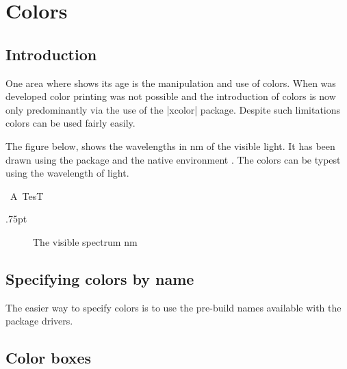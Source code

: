 \chapter{Colors}
\section{Introduction}

One area where \latex shows its age is the manipulation and use of colors. When \tex was developed color printing was not possible and the introduction of colors is now only predominantly via the use of the |xcolor| package. Despite such limitations colors can be used fairly easily.

The figure below, shows the wavelengths in nm of the visible light. It has been drawn using the  package and the native \latex environment . The colors can be typest using the wavelength of light.

\smallskip

\begin{texexample}{}{}
  \hbox{\color{thered} A TesT}
\end{texexample}




\newcount\WL \unitlength.75pt

\begin{figure}
\hskip-3pt
\caption{The visible spectrum nm}
\end{figure}



\section{Specifying colors by name}

The easier way to specify colors is to use the pre-build names available
with the package drivers.


\section{Color boxes}

